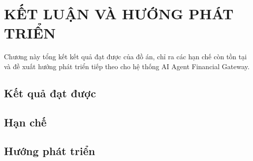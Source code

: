 \chapter{KẾT LUẬN VÀ HƯỚNG PHÁT TRIỂN}

Chương này tổng kết kết quả đạt được của đồ án, chỉ ra các hạn chế còn tồn tại và đề xuất hướng phát triển tiếp theo cho hệ thống AI Agent Financial Gateway.

\section{Kết quả đạt được}


\section{Hạn chế}


\section{Hướng phát triển}

